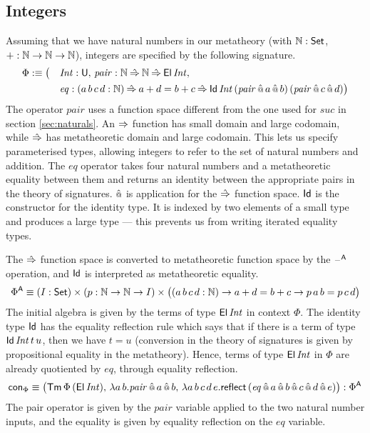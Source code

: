 \documentclass[acmsmall,screen]{acmart}
\begin{document}
\subsection{Integers}
\label{sec:integers}

Assuming that we have natural numbers in our metatheory (with $\mathbb{N} : \mathsf{Set}$,
$+ : \mathbb{N}\rightarrow\mathbb{N}\rightarrow\mathbb{N}$), integers are specified by the following signature.
\begin{alignat*}{5}
  & \Phi :\equiv \big( && \mathit{Int} : \mathsf{U},\, \mathit{pair} : \mathbb{N}\mathbin{\hat{\Rightarrow}}\mathbb{N}\mathbin{\hat{\Rightarrow}}\mathsf{El}\,\mathit{Int}, \\
  & && \mathit{eq}:(a\,b\,c\,d:\mathbb{N})\mathbin{\hat{\Rightarrow}} a+d=b+c \mathbin{\hat{\Rightarrow}}\mathsf{Id}\,\mathit{Int}\,(\mathit{pair}\mathop{\hat{\mathop{{\scriptstyle @}}}} a\mathop{\hat{\mathop{{\scriptstyle @}}}} b)\,(\mathit{pair}\mathop{\hat{\mathop{{\scriptstyle @}}}} c\mathop{\hat{\mathop{{\scriptstyle @}}}} d)\big)
\end{alignat*}
The operator $\mathit{pair}$ uses a function space different from the
one used for $\mathit{suc}$ in section \ref{sec:naturals}. An $\Rightarrow$
function has small domain and large codomain, while $\mathbin{\hat{\Rightarrow}}$ has
metatheoretic domain and large codomain. This lets us specify
parameterised types, allowing integers to refer to the set of natural
numbers and addition. The $\mathit{eq}$ operator takes four natural
numbers and a metatheoretic equality between them and returns an
identity between the appropriate pairs in the theory of
signatures. $\mathop{\hat{\mathop{{\scriptstyle @}}}}$ is application for the $\mathbin{\hat{\Rightarrow}}$ function
space. $\mathsf{Id}$ is the constructor for the identity type. It is indexed
by two elements of a small type and produces a large type --- this
prevents us from writing iterated equality types.

The $\mathbin{\hat{\Rightarrow}}$ function space is converted to metatheoretic function space
by the $\mathord{\hspace{1pt}\text{--}\hspace{1pt}}^{\mathsf{A}}$ operation, and $\mathsf{Id}$ is interpreted as metatheoretic
equality.
\[
\Phi^{\mathsf{A}} \equiv (I:\mathsf{Set})\times(p:\mathbb{N}\rightarrow\mathbb{N}\rightarrow I)\times\big((a\,b\,c\,d:\mathbb{N})\rightarrow a+d=b+c\rightarrow p\,a\,b=p\,c\,d\big)
\]
The initial algebra is given by the terms of type $\mathsf{El}\,\mathit{Int}$
in context $\Phi$. The identity type $\mathsf{Id}$ has the equality reflection
rule which says that if there is a term of type
$\mathsf{Id}\,\mathit{Int}\,t\,u$, then we have $t = u$ (conversion in the
theory of signatures is given by propositional equality in the
metatheory). Hence, terms of type $\mathsf{El}\,\mathit{Int}$ in $\Phi$ are
already quotiented by $\mathit{eq}$, through equality reflection.
\[
\mathsf{con}_\Phi \equiv \big(\mathsf{Tm}\,\Phi\,(\mathsf{El}\,\mathit{Int}),\, \lambda a\,b.\mathit{pair}\mathop{\hat{\mathop{{\scriptstyle @}}}} a\mathop{\hat{\mathop{{\scriptstyle @}}}} b,\, \lambda a\,b\,c\,d\,e.\mathsf{reflect}\,(\mathit{eq}\mathop{\hat{\mathop{{\scriptstyle @}}}} a\mathop{\hat{\mathop{{\scriptstyle @}}}} b\mathop{\hat{\mathop{{\scriptstyle @}}}} c\mathop{\hat{\mathop{{\scriptstyle @}}}} d\mathop{\hat{\mathop{{\scriptstyle @}}}} e)\big) : \Phi^{\mathsf{A}}
\]
The pair operator is given by the $\mathit{pair}$ variable applied
to the two natural number inputs, and the equality is given by
equality reflection on the $\mathit{eq}$ variable.
\end{document}
